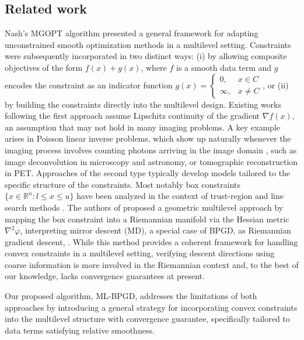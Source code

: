 \documentclass[11pt,reqno]{amsart}
\numberwithin{equation}{section}
\numberwithin{figure}{section}
\theoremstyle{plain}
\theoremstyle{definition}
\newcommand{\R}{\mathbb{R}}
\newcommand{\vphi}{\varphi}
\newcommand{\df}{\nabla f}
\begin{document}
\subsection*{Related work}
Nash's MGOPT algorithm \cite{Nash:2000} presented a general framework for adapting unconstrained smooth optimization methods in a multilevel setting. Constraints were subsequently incorporated in two distinct ways: (i) by allowing composite objectives of the form $f(x) + g(x)$, where $f$ is a smooth data term and $g$ encodes the constraint as an indicator function $g(x) = \begin{cases}
0, &x \in C \\ \infty, &x \neq C
\end{cases}$, or (ii) by building the constraints directly into the multilevel design. 
Existing works following the first approach \cite{ang2023mgprox,Parpas:2017,Parpas:2016_Magma,Lauga2024} assume Lipschitz continuity of the gradient $\df(x)$, an assumption that may not hold in many imaging problems.
A key example arises in Poisson linear inverse problems, which show up naturally whenever the imaging process involves counting photons arriving in the image domain \cite{Vardi_EM, Geman1984}, such as image deconvolution in microscopy and astronomy, or tomographic reconstruction in PET. 
Approaches of the second type typically develop models tailored to the specific structure of the constraints. Most notably box constraints $\{x \in \R^n: l \leq x \leq u\}$ have been analyzed in the context of trust-region and line search methods \cite{Gratton:2008,WenGoldfarb:2009}. The authors of \cite{Mueller2022} proposed a geometric multilevel approach by mapping the box constraint into a Riemannian manifold via the Hessian metric $\nabla^2 \vphi$, interpreting mirror descent (MD), a special case of BPGD, as Riemannian gradient descent, \cite{Raskutti2015}. 
While this method provides a coherent framework for handling convex constraints in a multilevel setting, verifying descent directions using coarse information is more involved in the Riemannian context and, to the best of our knowledge, lacks convergence guarantees at present. 

Our proposed algorithm, ML-BPGD, addresses the limitations of both approaches by introducing a general strategy for incorporating convex constraints into the multilevel structure with convergence guarantee, specifically tailored to data terms satisfying relative smoothness.
\end{document}
